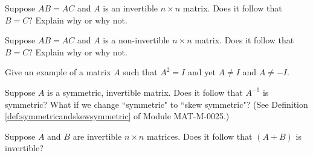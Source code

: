 \documentclass{ximera}
\begin{document}

\begin{problem}
Suppose $AB=AC$ and $A$ is an invertible $n\times n$ matrix. Does it
follow that $B=C?$ Explain why or why not.
\end{problem}

\begin{problem}
Suppose $AB=AC$ and $A$ is a non-invertible $n\times n$ matrix. Does it
follow that $B=C?$ Explain why or why not.
\end{problem}


\begin{problem}
Give an example of a matrix $A$ such that $A^{2}=I$ and yet $A\neq I$
and $A\neq -I.$
\end{problem}

\begin{problem}
Suppose $A$ is a symmetric, invertible matrix.  Does it follow that $A^{-1}$ is symmetric?  What if we change ``symmetric" to ``skew symmetric"?  (See Definition \ref{def:symmetricandskewsymmetric} of Module MAT-M-0025.)
\end{problem}

\begin{problem} Suppose $A$ and $B$ are invertible $n\times n$ matrices.  Does it follow that $(A+B)$ is invertible?
\end{problem}
\end{document}
